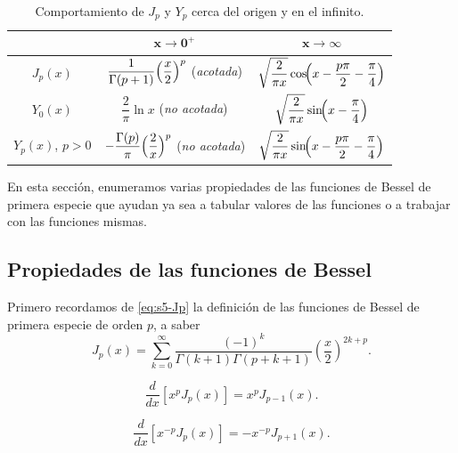 \begin{table}[H]
\centering
\small
\caption{Comportamiento de $J_p$ y $Y_p$ cerca del origen y en el infinito.}
\label{tab:s5-comportamiento}
\begin{tabular}{|c|c|c|}
\hline
\rowcolor{bbe!15} & $\mathbf{x\to0^+}$ & $\mathbf{x\to\infty}$ \\ \hline
$J_p(x)$ & $\dfrac{1}{\Gamma(p+1)}\Bigl(\dfrac x2\Bigr)^p$ \quad (\emph{acotada}) & $\sqrt{\dfrac{2}{\pi x}}\cos\!\Bigl(x-\dfrac{p\pi}{2}-\dfrac\pi4\Bigr)$ \\ \hline
$Y_0(x)$ & $\dfrac2\pi\ln x$ \quad (\emph{no acotada}) & $\sqrt{\dfrac{2}{\pi x}}\sin\!\Bigl(x-\dfrac\pi4\Bigr)$ \\ \hline
$Y_p(x)$, $p>0$ & $-\dfrac{\Gamma(p)}{\pi}\Bigl(\dfrac 2x\Bigr)^p$ \quad (\emph{no acotada}) & $\sqrt{\dfrac{2}{\pi x}}\sin\!\Bigl(x-\dfrac{p\pi}{2}-\dfrac\pi4\Bigr)$ \\ \hline
\end{tabular}
\end{table}
 
En esta sección, enumeramos varias propiedades de las funciones de Bessel de primera especie que ayudan ya sea a tabular valores de las funciones o a trabajar con las funciones mismas.
 
\subsection{Propiedades de las funciones de Bessel}
 
Primero recordamos de \eqref{eq:s5-Jp} la definición de las funciones de Bessel de primera especie de orden $p$, a saber
\begin{equation}
J_p(x) = \sum_{k=0}^{\infty} \frac{(-1)^k}{\Gamma(k + 1)\Gamma(p + k + 1)} \left( \frac{x}{2} \right)^{2k+p}.
\label{eq:s5-Jp-repetida}
\end{equation}
 
\begin{theorem}[Propiedad 1]\label{thm:s5-P1}
\begin{equation}
\frac{d}{dx} [x^p J_p(x)] = x^p J_{p-1}(x).
\label{eq:s5-P1}
\end{equation}
\end{theorem}
 
\begin{theorem}[Propiedad 2]\label{thm:s5-P2}
\begin{equation}
\frac{d}{dx} [x^{-p} J_p(x)] = -x^{-p} J_{p+1}(x).
\label{eq:s5-P2}
\end{equation}
\end{theorem}
 
